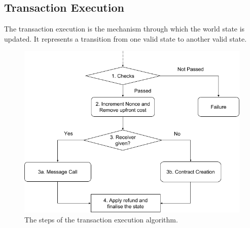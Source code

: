 \subsection{Transaction Execution}
The transaction execution is the mechanism through which the world state is
updated. It represents a transition from one
valid state to another valid state.

\begin{figure}
	\begin{center}
		\includegraphics[scale=0.5]{./res/img/tx-execution-algorithm.png}
	\end{center}
	\caption{The steps of the transaction execution algorithm.}
	\label{fig:tx:execution}
\end{figure}

